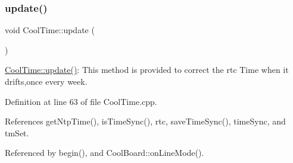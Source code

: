 \subsubsection{\texorpdfstring{update()}{update()}}
{\footnotesize\ttfamily void Cool\+Time\+::update (\begin{DoxyParamCaption}{ }\end{DoxyParamCaption})}

\hyperlink{classCoolTime_aae601f795452cfa48d9fb337aed483a8}{Cool\+Time\+::update()}\+: This method is provided to correct the rtc Time when it drifts,once every week. 

Definition at line 63 of file Cool\+Time.\+cpp.



References get\+Ntp\+Time(), is\+Time\+Sync(), rtc, save\+Time\+Sync(), time\+Sync, and tm\+Set.



Referenced by begin(), and Cool\+Board\+::on\+Line\+Mode().


